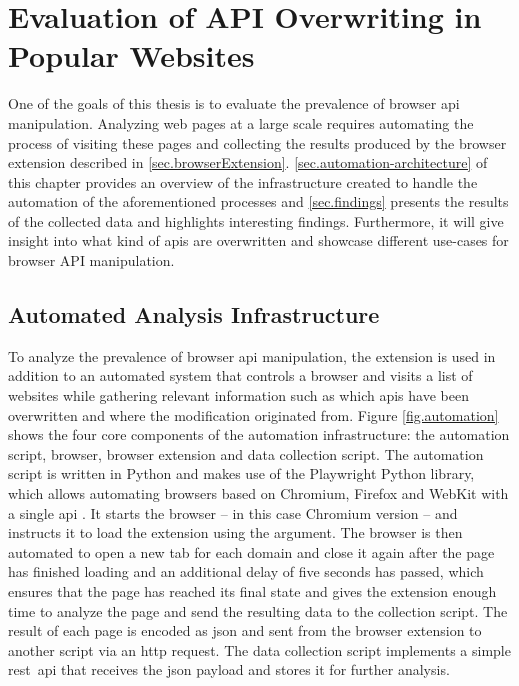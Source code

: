 \chapter{Evaluation of API Overwriting in Popular Websites}
\label{sec.evaluation}

One of the goals of this thesis is to evaluate the prevalence of browser \acs{api} manipulation. Analyzing web pages at a large scale requires automating the process of visiting these pages and collecting the results produced by the browser extension described in \autoref{sec.browserExtension}. \autoref{sec.automation-architecture} of this chapter provides an overview of the infrastructure created to handle the automation of the aforementioned processes and \autoref{sec.findings} presents the results of the collected data and highlights interesting findings. Furthermore, it will give insight into what kind of \acsp{api} are overwritten and showcase different use-cases for browser API manipulation.



\section{Automated Analysis Infrastructure}
\label{sec.automation-architecture}

To analyze the prevalence of browser \acs{api} manipulation, the extension is used in addition to an automated system that controls a browser and visits a list of websites while gathering relevant information such as which \acsp{api} have been overwritten and where the modification originated from. Figure \ref{fig.automation} shows the four core components of the automation infrastructure: the automation script, browser, browser extension and data collection script. The automation script is written in Python and makes use of the Playwright Python library, which allows automating browsers based on Chromium, Firefox and WebKit with a single \acs{api} \cite{PlaywrightPython}. It starts the browser – in this case Chromium version  – and instructs it to load the extension using the  argument. The browser is then automated to open a new tab for each domain and close it again after the page has finished loading and an additional delay of five seconds has passed, which ensures that the page has reached its final state and gives the extension enough time to analyze the page and send the resulting data to the collection script. The result of each page is encoded as \acs{json} and sent from the browser extension to another script via an \acs{http} request. The data collection script implements a simple \acs{rest}~\acs{api} that receives the \acs{json} payload and stores it for further analysis.

